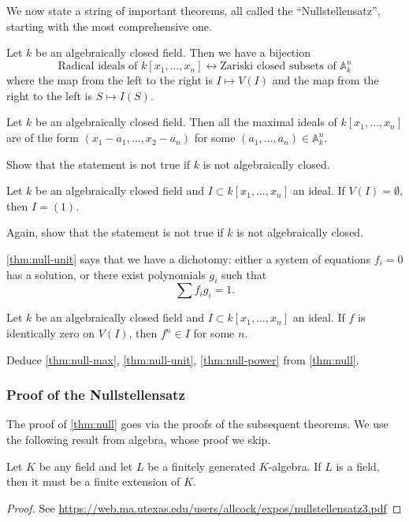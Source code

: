 \documentclass[11pt]{article}
\begin{document}
We now state a string of important theorems, all called the ``Nullstellensatz'', starting with the most comprehensive one.
\begin{theorem}
Let \(k\) be an algebraically closed field. Then we have a bijection
\[ \text{Radical ideals of \(k[x_1, \dots, x_n]\)} \leftrightarrow \text{Zariski closed subsets of \(\mathbb A^n_k\)}\]
where the map from the left to the right is \(I \mapsto V(I)\) and the map from the right to the left is \(S \mapsto I(S)\).
\label{thm:null}
\end{theorem}
\begin{theorem}
Let \(k\) be an algebraically closed field. Then all the maximal ideals of \(k[x_1,\dots,x_n]\) are of the form \((x_1-a_1, \dots, x_2-a_n)\) for some \((a_1, \dots, a_n) \in \mathbb A^n_k\).
\label{thm:null-max}
\end{theorem}
\begin{skipped}
Show that the statement is not true if \(k\) is not algebraically closed.
\end{skipped}
\begin{theorem}
Let \(k\) be an algebraically closed field and \(I \subset k[x_1,\dots,x_n]\) an ideal. If \(V(I) = \emptyset\), then \(I = (1)\).
\label{thm:null-unit}
\end{theorem}
\begin{skipped}
Again, show that the statement is not true if \(k\) is not algebraically closed.
\end{skipped}
\ref{thm:null-unit} says that we have a dichotomy: either a system of equations \(f_i = 0\) has a solution, or there exist polynomials \(g_i\) such that
 \[ \sum f_i g_i = 1.\]
\begin{theorem}
Let \(k\) be an algebraically closed field and \(I \subset k[x_1,\dots,x_n]\) an ideal. If \(f\) is identically zero on \(V(I)\), then \(f^n \in I\) for some \(n\).
\label{thm:null-power}
\end{theorem}
\begin{skipped}
Deduce \ref{thm:null-max}, \ref{thm:null-unit}, \ref{thm:null-power} from \ref{thm:null}.
\end{skipped}

\subsubsection{Proof of the Nullstellensatz}
\label{sec:orgec38796}
The proof of \ref{thm:null} goes via the proofs of the subsequent theorems.
We use the following result from algebra, whose proof we skip.
\begin{theorem}
Let \(K\) be any field and let \(L\) be a finitely generated \(K\)-algebra.
If \(L\) is a field, then it must be a finite extension of \(K\).
\label{thm:null-alg}
\end{theorem}
\begin{proof}
See \url{https://web.ma.utexas.edu/users/allcock/expos/nullstellensatz3.pdf}
\end{proof}
\end{document}
